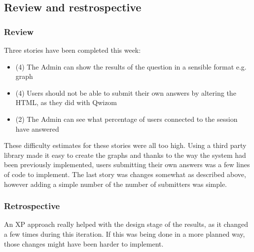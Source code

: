 \subsection{Review and restrospective}
\subsubsection{Review}
Three stories have been completed this week:
\begin{itemize}
	\item (4) The Admin can show the results of the question in a sensible format e.g. graph
	\item (4) Users should not be able to submit their own answers by altering the HTML, as they did with Qwizom
	\item (2) The Admin can see what percentage of users connected to the session have answered
\end{itemize}
These difficulty estimates for these stories were all too high. Using a third party library made it easy to create the graphs and thanks to the way the system had been previously implemented, users submitting their own answers was a few lines of code to implement. The last story was changes somewhat as described above, however adding a simple number of the number of submitters was simple.

\subsubsection{Retrospective}
An XP approach really helped with the design stage of the results, as it changed a few times during this iteration. If this was being done in a more planned way, those changes might have been harder to implement.
\newpage
